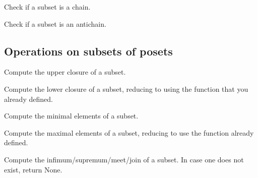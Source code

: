 \begin{exercise}
  Check if a subset is a chain.
\end{exercise}

\begin{exercise}
  Check if a subset is an antichain.
\end{exercise}

\subsection{Operations on subsets of posets}

\begin{exercise}
  Compute the upper closure of a subset.

\end{exercise}


\begin{exercise}
  Compute the lower closure of a subset, reducing to
  using the function  that you
  already defined.

\end{exercise}



\begin{exercise}
  Compute the minimal elements of a subset.


\end{exercise}


\begin{exercise}
  Compute the maximal elements of a subset, reducing
  to use the function  already defined.


\end{exercise}


\begin{exercise}
  Compute the infimum/supremum/meet/join of a subset.
  In case one does not exist, return None.


\end{exercise}

